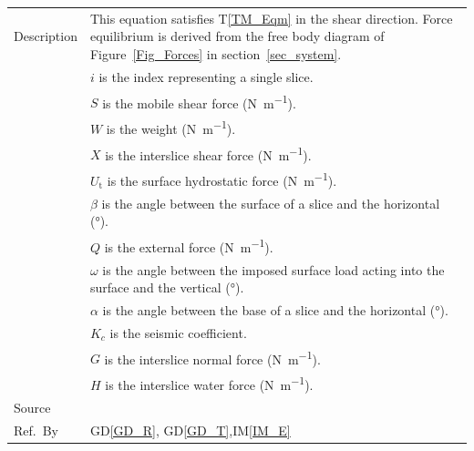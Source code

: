 \documentclass[12pt]{article}
\newcommand{\colAwidth}{0.13\textwidth}
\newcommand{\colBwidth}{0.82\textwidth}
\newcommand{\tref}[1]{T\ref{#1}}
\newcommand{\iref}[1]{IM\ref{#1}}
\newcommand{\dref}[1]{GD\ref{#1}}
\begin{document}
\begin{minipage}{\textwidth}
\begin{tabular}{| p{\colAwidth} | p{\colBwidth}|}
  \hline Description & This equation satisfies \tref{TM_Eqm} in the shear 
  direction. Force equilibrium is derived from the free body diagram of 
  Figure~\ref{Fig_Forces} in section~\ref{sec_system}.\\
  &$i$ is the index representing a single slice.\\
  &$S$ is the mobile shear force (\si{\newton\per\meter}). \\
  &$W$ is the weight (\si{\newton\per\meter}). \\
  &$X$ is the interslice shear force (\si{\newton\per\meter}). \\
  &$U_\text{t}$ is the surface hydrostatic force (\si{\newton\per\meter}). \\
  &$\beta$ is the angle between the surface of a slice and the 
  horizontal (\si{\degree}). \\
  &$Q$ is the external force (\si{\newton\per\meter}). \\
  &$\omega$ is the angle between the imposed surface load acting into 
  the surface and the vertical (\si{\degree}). \\
  &$\alpha$ is the angle between the base of a slice and the 
  horizontal (\si{\degree}). \\
  &$K_c$ is the seismic coefficient. \\
  &$G$ is the interslice normal force (\si{\newton\per\meter}). \\
  &$H$ is the interslice water force (\si{\newton\per\meter}). \\

  \hline Source & \cite{ZhuEtAl2005}\\
  
  \hline Ref.\ By & \dref{GD_R}, \dref{GD_T},\iref{IM_E}\\
  
  \hline
\end{tabular}
\end{minipage}\\

~\newline
\end{document}
